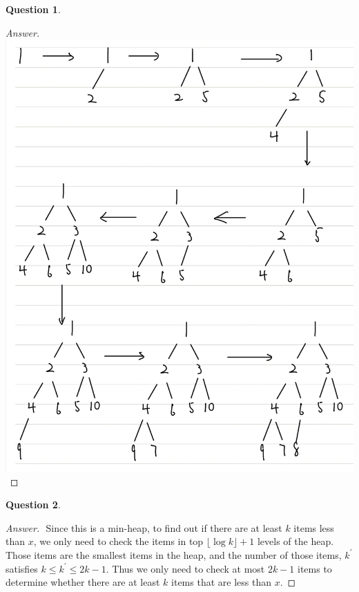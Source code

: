 \documentclass{article}
\theoremstyle{plain}
\newtheorem{question}{Question}
\newenvironment{answer}[1][Answer]
    {\begin{proof}[#1]{$ $}\renewcommand\qedsymbol{$\vartriangle$}}
    {\end{proof}}
\begin{document}
\begin{question}
\end{question}
\begin{answer}
    \includegraphics[width=0.9\columnwidth]{Q2.jpg}
\end{answer}

\begin{question}
\end{question}
\begin{answer}
    Since this is a min-heap, to find out if there are at least $k$ items less than $x$, we only need to check the items in top $\lfloor \log k \rfloor + 1$ levels of the heap. Those items are the smallest items in the heap, and the number of those items, $k^\prime$ satisfies $k \leq k^\prime \leq 2k - 1$. Thus we only need to check at most $2k- 1$ items to determine whether there are at least $k$ items that are less than $x$.
\end{answer}
\end{document}
